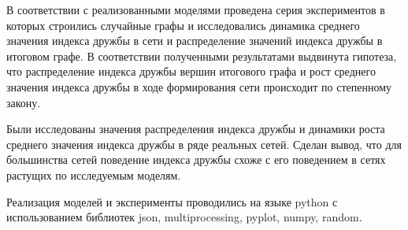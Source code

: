 \documentclass[bachelor, och, diploma]{SCWorks}
\begin{document}
В соответствии с реализованными моделями проведена серия экспериментов в которых строились случайные графы и исследовались динамика среднего значения индекса дружбы в сети и распределение значений индекса дружбы в итоговом графе. В соответствии полученными результатами выдвинута гипотеза, что распределение индекса дружбы вершин итогового графа и рост среднего значения индекса дружбы в ходе формирования сети происходит по степенному закону.  

Были исследованы значения распределения индекса дружбы и динамики роста среднего значения индекса дружбы в ряде реальных сетей. Сделан вывод, что для большинства сетей поведение индекса дружбы схоже с его поведением в сетях растущих по исследуемым моделям.

Реализация моделей и эксперименты проводились на языке python  с использованием библиотек json, multiprocessing, pyplot, numpy, random.






\appendix
\end{document}

